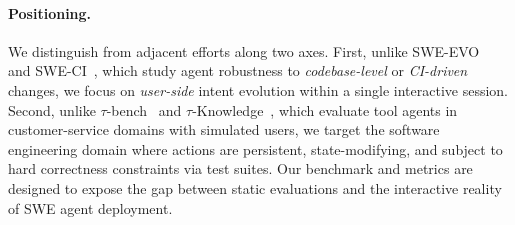 \paragraph{Positioning.}
We distinguish \drift{} from adjacent efforts along two axes. First, unlike SWE-EVO~\citep{sweevo2025} and SWE-CI~\citep{sweci2026}, which study agent robustness to \emph{codebase-level} or \emph{CI-driven} changes, we focus on \emph{user-side} intent evolution within a single interactive session. Second, unlike $\tau$-bench~\citep{yao2024taubench} and $\tau$-Knowledge~\citep{tauknowledge2026}, which evaluate tool agents in customer-service domains with simulated users, we target the software engineering domain where actions are persistent, state-modifying, and subject to hard correctness constraints via test suites. Our benchmark and metrics are designed to expose the gap between static evaluations and the interactive reality of SWE agent deployment.
